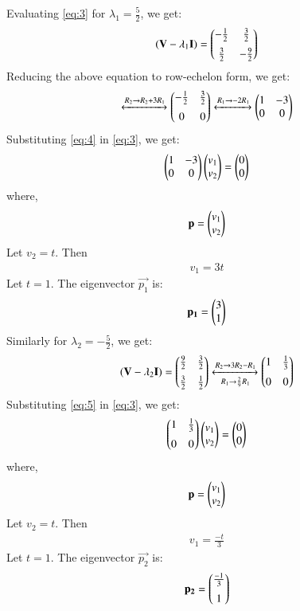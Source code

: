 \documentclass[journal,12pt,twocolumn]{IEEEtran}
\begin{document}
Evaluating \eqref{eq:3} for $\lambda_1 = \frac{5}{2}$, we get:
\begin{align}
  (\mathbf{V} - \lambda_1 \mathbf{I})  = \begin{pmatrix}-\frac{1}{2} & \frac{3}{2} \\[0.2cm]\frac{3}{2} & -\frac{9}{2}\end{pmatrix}
\end{align}
Reducing the above equation to row-echelon form, we get:
\begin{align}
  \xleftrightarrow[]{R_2 \rightarrow R_2 + 3R_1} \begin{pmatrix}-\frac{1}{2} & \frac{3}{2} \\[0.2cm]0 & 0\end{pmatrix} \xleftrightarrow[]{R_1 \rightarrow -2R_1} \begin{pmatrix}1 & -3 \\ 0 & 0\end{pmatrix} \label{eq:4}
\end{align}
Substituting \eqref{eq:4} in \eqref{eq:3}, we get:
\begin{align}
  \begin{pmatrix}1 & -3 \\ 0 & 0\end{pmatrix} \begin{pmatrix}v_1 \\ v_2\end{pmatrix} = \begin{pmatrix}0 \\ 0\end{pmatrix}
\end{align}
where,
\begin{align}
  \mathbf{p} = \begin{pmatrix}v_1 \\ v_2\end{pmatrix}
\end{align}
Let $v_2 = t$. Then
\begin{align}
  v_1 = 3t
\end{align}
Let $t = 1$. The eigenvector $\vec{p_1}$ is:
\begin{align}
  \mathbf{p_1} = \begin{pmatrix}3 \\ 1\end{pmatrix}
\end{align}
Similarly for $\lambda_2 = -\frac{5}{2}$, we get:
\begin{align}
    (\mathbf{V} - \lambda_2 \mathbf{I})  = \begin{pmatrix}\frac{9}{2} & \frac{3}{2} \\[0.2cm]\frac{3}{2} & \frac{1}{2}\end{pmatrix} \xleftrightarrow[R_1 \rightarrow \frac{2}{9}R_1]{R_2 \rightarrow 3R_2 - R_1} \begin{pmatrix}1 & \frac{1}{3} \\[0.2cm]0 & 0\end{pmatrix} \label{eq:5}
\end{align}
Substituting \eqref{eq:5} in \eqref{eq:3}, we get:
\begin{align}
  \begin{pmatrix}1 & \frac{1}{3} \\[0.2cm]0 & 0\end{pmatrix} \begin{pmatrix}v_1 \\ v_2\end{pmatrix} = \begin{pmatrix}0 \\ 0\end{pmatrix}
\end{align}
where,
\begin{align}
  \mathbf{p} = \begin{pmatrix}v_1 \\ v_2\end{pmatrix}
\end{align}
Let $v_2 = t$. Then
\begin{align}
  v_1 = \frac{-t}{3}
\end{align}
Let $t = 1$. The eigenvector $\vec{p_2}$ is:
\begin{align}
  \mathbf{p_2} = \begin{pmatrix}\frac{-1}{3} \\[0.2cm] 1\end{pmatrix}
\end{align}
\end{document}
